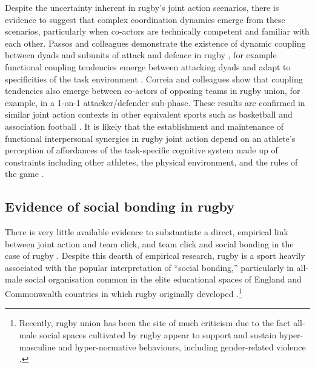 \begin{CJK}{UTF8}{gbsn}
Despite the uncertainty inherent in rugby's joint action scenarios, there is evidence to suggest that complex coordination dynamics emerge from these scenarios, particularly when co-actors are technically competent and familiar with each other. Passos and colleagues demonstrate the existence of dynamic coupling between dyads and subunits of attack and defence in rugby \citep{Passos2011,Correia2014}, for example functional coupling tendencies emerge between attacking dyads and adapt to specificities of the task environment \textcite{Passos2011}.  Correia and colleagues \textcite{Correia2014} show that coupling tendencies also emerge between co-actors of opposing teams in rugby union, for example, in a 1-on-1 attacker/defender sub-phase.  These results are confirmed in similar joint action contexts in other equivalent sports such as basketball and association football \citep{Duarte2013}. It is likely that the establishment and maintenance of functional interpersonal synergies in rugby joint action depend on an athlete's perception of affordances of the task-specific cognitive system made up of constraints including other athletes, the physical environment, and the rules of the game \citep{Passos2012}.














\subsection{Evidence of social bonding in rugby}
There is very little available evidence to substantiate a direct, empirical link between joint action and team click, and team click and social bonding in the case of rugby \citep[but for a discussion, see][]{Davis2015}.  Despite this dearth of empirical research, rugby is a sport heavily associated with the popular interpretation of ``social bonding,'' particularly in all-male social organisation common in the elite educational spaces of England and Commonwealth countries in which rugby originally developed \citep{Dunning2005,Richards2007,Collins2008}.\footnote{Recently, rugby union has been the site of much criticism due to the fact all-male social spaces cultivated by rugby appear to support and sustain hyper-masculine and hyper-normative behaviours, including gender-related violence \citep{Cosslett2014}.}


\end{CJK}
